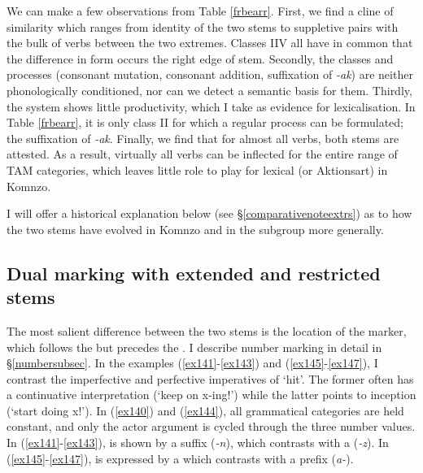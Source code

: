 We can make a few observations from Table \ref{frbearr}. First, we find a cline of similarity which ranges from identity of the two stems to suppletive pairs with the bulk of verbs between the two extremes. Classes II\textendash{}V all have in common that the difference in form occurs the right edge of stem. Secondly, the classes and processes (consonant mutation, consonant addition, suffixation of \emph{-ak}) are neither phonologically conditioned, nor can we detect a semantic basis for them. Thirdly, the system shows little productivity, which I take as evidence for lexicalisation. In Table \ref{frbearr}, it is only class II for which a regular process can be formulated; the suffixation of \emph{-ak}. Finally, we find that for almost all verbs, both stems are attested. As a result, virtually all verbs can be inflected for the entire range of TAM categories, which leaves little role to play for lexical  (or Aktionsart) in Komnzo.%

I will offer a historical explanation below (see \S{}\ref{comparativenoteextrs}) as to how the two stems have evolved in Komnzo and in the  subgroup more generally.

\subsection{Dual marking with extended and restricted stems} \label{dualextrs}

The most salient difference between the two stems is the location of the  marker, which follows the  but precedes the . I describe number marking in detail in \S{}\ref{numbersubsec}. In the examples (\ref{ex141}-\ref{ex143}) and (\ref{ex145}-\ref{ex147}), I contrast the imperfective and perfective imperatives of `hit'. The former often has a continuative interpretation (`keep on x-ing!') while the latter points to inception (`start doing x!'). In (\ref{ex140}) and (\ref{ex144}), all grammatical categories are held constant, and only the actor argument is cycled through the three number values. In (\ref{ex141}-\ref{ex143}),  is shown by a suffix (\emph{-n}), which contrasts with a  (\emph{-z}). In (\ref{ex145}-\ref{ex147}),  is expressed by a  which contrasts with a  prefix (\emph{a-}).

